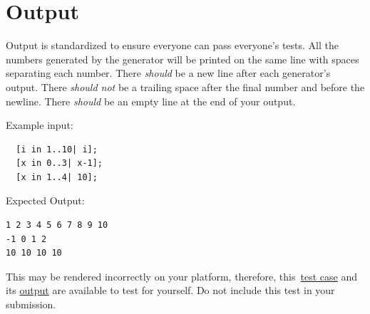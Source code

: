 \documentclass{article}
\begin{document}
\section{Output}
Output is standardized to ensure everyone can pass everyone's tests. All the numbers generated by
the generator will be printed on the same line with spaces separating each number. There
\textit{should} be a new line after each generator's output. There \textit{should not} be a
trailing space after the final number and before the newline. There \textit{should} be an empty
line at the end of your output.

Example input:
\begin{lstlisting}
  [i in 1..10| i];
  [x in 0..3| x-1];
  [x in 1..4| 10];
\end{lstlisting}

Expected Output:
\begin{lstlisting}
1 2 3 4 5 6 7 8 9 10
-1 0 1 2
10 10 10 10
\end{lstlisting}

This may be rendered incorrectly on your platform, therefore, this\
\href{https://webdocs.cs.ualberta.ca/\%7Ec415/generator/static/ex.in} {test case} and its
\href{https://webdocs.cs.ualberta.ca/\%7Ec415/generator/static/ex.out} {output} are available to
test for yourself. Do not include this test in your submission.
\end{document}
